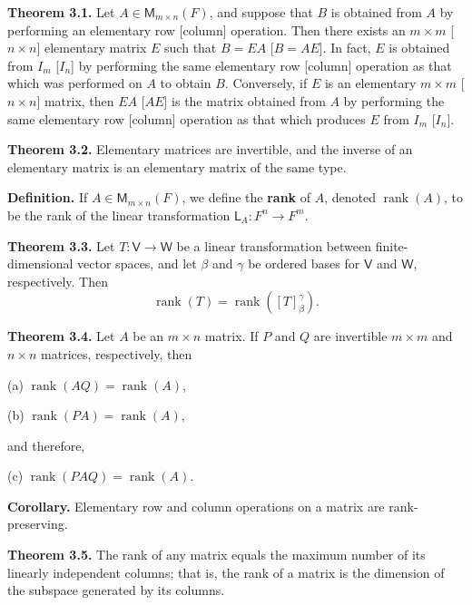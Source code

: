 \documentclass{article}
\newcommand{\0}{\mathit{0}}
\begin{document}
\medskip

\textbf{Theorem 3.1.} Let $A \in \mathsf{M}_{m \times n}(F)$, and suppose that $B$ is obtained from
$A$ by performing an elementary row [column] operation. Then there exists an
$m \times m$ [$n \times n$] elementary matrix $E$ such that $B = EA$ [$B = AE$]. In fact,
$E$ is obtained from $I_m$ [$I_n$] by performing the same elementary row [column]
operation as that which was performed on $A$ to obtain $B$. Conversely, if $E$ is
an elementary $m \times m$ [$n \times n$] matrix, then $EA$ [$AE$] is the matrix obtained
from $A$ by performing the same elementary row [column] operation as that
which produces $E$ from $I_m$ [$I_n$].

\medskip

\textbf{Theorem 3.2.} Elementary matrices are invertible, and the inverse of an
elementary matrix is an elementary matrix of the same type.

\medskip

\textbf{Definition.} If $A \in \mathsf{M}_{m \times n}(F)$, we define the \textbf{rank} of $A$,
denoted $\operatorname{rank}(A)$, to be the rank of the linear transformation
$\mathsf{L}_A : F^n \to F^m$.

\medskip

\textbf{Theorem 3.3.} Let $T: \mathsf{V} \to \mathsf{W}$ be a linear transformation between
finite-dimensional vector spaces, and let $\beta$ and $\gamma$ be ordered bases for
$\mathsf{V}$ and $\mathsf{W}$, respectively. Then
\[
    \operatorname{rank}(T) = \operatorname{rank}\left( [T]^\gamma_\beta \right).
\]

\medskip

\textbf{Theorem 3.4.} Let $A$ be an $m \times n$ matrix. If $P$ and $Q$ are invertible
$m \times m$ and $n \times n$ matrices, respectively, then

(a) $\operatorname{rank}(AQ) = \operatorname{rank}(A)$,

(b) $\operatorname{rank}(PA) = \operatorname{rank}(A)$,

and therefore,

(c) $\operatorname{rank}(PAQ) = \operatorname{rank}(A)$.

\medskip

\textbf{Corollary.} Elementary row and column operations on a matrix are rank-preserving.

\medskip

\textbf{Theorem 3.5.} The rank of any matrix equals the maximum number of its
linearly independent columns; that is, the rank of a matrix is the dimension
of the subspace generated by its columns.
\end{document}
